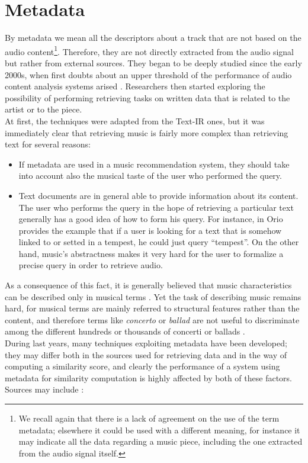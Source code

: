 \section{Metadata}
By metadata we mean all the descriptors about a track that are not based on the audio content\footnote{We recall again that there is a lack of agreement on the use of the term metadata; elsewhere it could be used with a different meaning, for instance it may indicate all the data regarding a music piece, including the one extracted from the audio signal itself.}. Therefore, they are not directly extracted from the audio signal but rather from external sources. They began to be deeply studied since the early 2000s, when first doubts about an upper threshold of the performance of audio content analysis systems arised \cite{aucou04}. Researchers then started exploring the possibility of performing retrieving tasks on written data that is related to the artist or to the piece. \\At first, the techniques were adapted from the Text-IR ones, but it was immediately clear that retrieving music is fairly more complex than retrieving text for several reasons:
\begin{itemize}
\item If metadata are used in a music recommendation system, they should take into account also the musical taste of the user who performed the query.
\item Text documents are in general able to provide information about its content. The user who performs the query in the hope of retrieving a particular text generally has a good idea of how to form his query. For instance, in \cite{orio06} Orio provides the example that if a user is looking for a text that is somehow linked to or setted in a tempest, he could just query ``tempest''. On the other hand, music's abstractness makes it very hard for the user to formalize a precise query in order to retrieve audio. 
\end{itemize}
As a consequence of this fact, it is generally believed that music characteristics can be described only in musical terms \cite{orio06}. Yet the task of describing music remains hard, for musical terms are mainly referred to structural features rather than the content, and therefore terms like \textit{concerto} or \textit{ballad} are not useful to discriminate among the different hundreds or thousands of concerti or ballads \cite{orio06}. \\ 
During last years, many techniques exploiting metadata have been developed; they may differ both in the sources used for retrieving data and in the way of computing a similarity score, and clearly the performance of a system using metadata for similarity computation is highly affected by both of these factors. Sources may include \cite{bogdanov13}:
